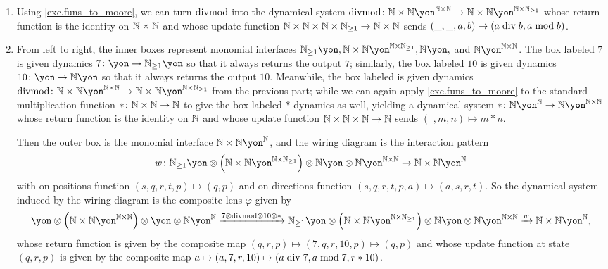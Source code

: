 \documentclass[Book-Poly]{subfiles}
\begin{document}
\begin{exercise}
\begin{solution}
\begin{enumerate}
    \item Using \cref{exc.funs_to_moore}, we can turn $\mathrm{divmod}$ into the dynamical system $\fun{divmod}\colon\nn\times\nn\yon^{\nn\times\nn}\to\nn\times\nn\yon^{\nn\times\nn_{\geq1}}$ whose return function is the identity on $\mathbb{N}\times\mathbb{N}$ and whose update function $\mathbb{N}\times\mathbb{N}\times\mathbb{N}\times\mathbb{N}_{\geq1}\to\mathbb{N}\times\mathbb{N}$ sends $(\_,\_,a,b)\mapsto(a\bdiv b,a\bmod b)$.
    \item From left to right, the inner boxes represent monomial interfaces $\nn_{\geq1}\yon, \nn\times\nn\yon^{\nn\times\nn_{\geq1}}, \nn\yon,$ and $\nn\yon^{\nn\times\nn}$.
    The box labeled $7$ is given dynamics $7\colon\yon\to\nn_{\geq1}\yon$ so that it always returns the output $7$; similarly, the box labeled $10$ is given dynamics $10\colon\yon\to\nn\yon$ so that it always returns the output $10$.
    Meanwhile, the box labeled is given dynamics $\fun{divmod}\colon\nn\times\nn\yon^{\nn\times\nn}\to\nn\times\nn\yon^{\nn\times\nn_{\geq1}}$ from the previous part; while we can again apply \cref{exc.funs_to_moore} to the standard multiplication function $*\colon\mathbb{N}\times\mathbb{N}\to\mathbb{N}$ to give the box labeled $*$ dynamics as well, yielding a dynamical system $*\colon\nn\yon^\nn\to\nn\yon^{\nn\times\nn}$ whose return function is the identity on $\mathbb{N}$ and whose update function $\mathbb{N}\times\mathbb{N}\times\mathbb{N}\to\mathbb{N}$ sends $(\_,m,n)\mapsto m*n$.
    
    Then the outer box is the monomial interface $\nn\times\nn\yon^\nn$, and the wiring diagram is the interaction pattern
    \[
        w\colon\nn_{\geq1}\yon\otimes\left(\nn\times\nn\yon^{\nn\times\nn_{\geq1}}\right)\otimes\nn\yon\otimes\nn\yon^{\nn\times\nn}\to\nn\times\nn\yon^\nn
    \]
    with on-positions function $(s,q,r,t,p)\mapsto(q,p)$ and on-directions function $(s,q,r,t,p,a)\mapsto(a,s,r,t)$.
    So the dynamical system induced by the wiring diagram is the composite lens $\varphi$ given by
    \[
        \yon\otimes\left(\nn\times\nn\yon^{\nn\times\nn}\right)\otimes\yon\otimes\nn\yon^\nn\To{7\otimes\fun{divmod}\otimes10\otimes*}\nn_{\geq1}\yon\otimes\left(\nn\times\nn\yon^{\nn\times\nn_{\geq1}}\right)\otimes\nn\yon\otimes\nn\yon^{\nn\times\nn}\To{w}\nn\times\nn\yon^\nn,
    \]
    whose return function is given by the composite map $(q,r,p)\mapsto(7,q,r,10,p)\mapsto(q,p)$ and whose update function at state $(q,r,p)$ is given by the composite map $a\mapsto(a,7,r,10)\mapsto(a\bdiv7,a\bmod7,r*10)$.
    

\end{enumerate}
\end{solution}
\end{exercise}
\end{document}
